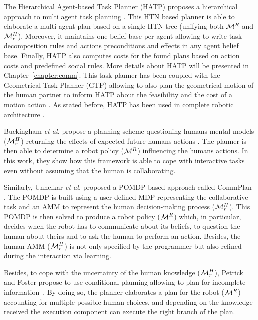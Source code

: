 \documentclass[a4paper,11pt,twoside]{StyleThese}
\begin{document}
The Hierarchical Agent-based Task Planner (HATP) proposes a hierarchical approach to multi agent task planning \cite{alili2009task, lallement2014hatp}. This HTN based planner is able to elaborate a multi agent plan based on a single HTN tree (unifying both $\mathcal{M}^R$ and $\mathcal{M}^H_r$). Moreover, it maintains one belief base per agent allowing to write task decomposition rules and actions preconditions and effects in any agent belief base. Finally, HATP also computes costs for the found plans based on action costs and predefined social rules. More details about HATP will be presented in Chapter~\ref{chapter:comm}. This task planner has been coupled with the Geometrical Task Planner (GTP) allowing to also plan the geometrical motion of the human partner to inform HATP about the feasibility and the cost of a motion action \cite{gharbi2015combining}. As stated before, HATP has been used in complete robotic architecture \cite{devin2016implemented, lemaignan2017artificial}.

Buckingham \textit{et al.} propose a planning scheme questioning humans mental models ($\mathcal{M}^H_r$) returning the effects of expected future humans actions \cite{buckingham2020robot}. The planner is then able to determine a robot policy ($\mathcal{M}^R$) influencing the humans actions. In this work, they show how this framework is able to cope with interactive tasks even without assuming that the human is collaborating.

Similarly, Unhelkar \textit{et al.} proposed a POMDP-based approach called CommPlan \cite{unhelkar2020decision}. The POMDP is built using a user defined MDP representing the collaborative task and an AMM to represent the human decision-making process ($\mathcal{M}^H_r$). This POMDP is then solved to produce a robot policy ($\mathcal{M}^R$) which, in particular, decides when the robot has to communicate about its beliefs, to question the human about theirs and to ask the human to perform an action. Besides, the human AMM ($\mathcal{M}^H_r$) is not only specified by the programmer but also refined during the interaction via learning.

Besides, to cope with the uncertainty of the human knowledge ($\mathcal{M}^H_r$), Petrick and Foster propose to use conditional planning allowing to plan for incomplete information~\cite{petrick2013planning}. By doing so, the planner elaborates a plan for the robot ($\mathcal{M}^R$) accounting for multiple possible human choices, and depending on the knowledge received the execution component can execute the right branch of the plan.
\end{document}
